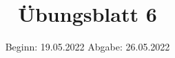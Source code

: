

\title{Übungsblatt 6}
\date{%
  Beginn: 19.05.2022
  \hspace{3em}
  Abgabe: 26.05.2022
}



\maketitle
\thispagestyle{empty}
\tableofcontents
\newpage






